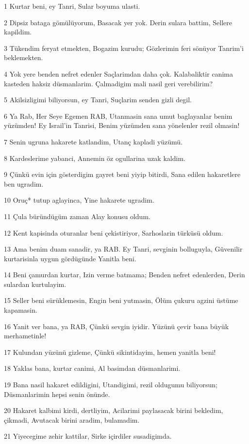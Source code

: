 \par 1 Kurtar beni, ey Tanri, Sular boyuma ulasti.
\par 2 Dipsiz bataga gömülüyorum, Basacak yer yok. Derin sulara battim, Sellere kapildim.
\par 3 Tükendim feryat etmekten, Bogazim kurudu; Gözlerimin feri sönüyor Tanrim'i beklemekten.
\par 4 Yok yere benden nefret edenler Saçlarimdan daha çok. Kalabaliktir canima kasteden haksiz düsmanlarim. Çalmadigim mali nasil geri verebilirim?
\par 5 Akilsizligimi biliyorsun, ey Tanri, Suçlarim senden gizli degil.
\par 6 Ya Rab, Her Seye Egemen RAB, Utanmasin sana umut baglayanlar benim yüzümden! Ey Israil'in Tanrisi, Benim yüzümden sana yönelenler rezil olmasin!
\par 7 Senin ugruna hakarete katlandim, Utanç kapladi yüzümü.
\par 8 Kardeslerime yabanci, Annemin öz ogullarina uzak kaldim.
\par 9 Çünkü evin için gösterdigim gayret beni yiyip bitirdi, Sana edilen hakaretlere ben ugradim.
\par 10 Oruç* tutup aglayinca, Yine hakarete ugradim.
\par 11 Çula büründügüm zaman Alay konusu oldum.
\par 12 Kent kapisinda oturanlar beni çekistiriyor, Sarhoslarin türküsü oldum.
\par 13 Ama benim duam sanadir, ya RAB. Ey Tanri, sevginin bolluguyla, Güvenilir kurtarisinla uygun gördügünde Yanitla beni.
\par 14 Beni çamurdan kurtar, Izin verme batmama; Benden nefret edenlerden, Derin sulardan kurtulayim.
\par 15 Seller beni sürüklemesin, Engin beni yutmasin, Ölüm çukuru agzini üstüme kapamasin.
\par 16 Yanit ver bana, ya RAB, Çünkü sevgin iyidir. Yüzünü çevir bana büyük merhametinle!
\par 17 Kulundan yüzünü gizleme, Çünkü sikintidayim, hemen yanitla beni!
\par 18 Yaklas bana, kurtar canimi, Al basimdan düsmanlarimi.
\par 19 Bana nasil hakaret edildigini, Utandigimi, rezil oldugumu biliyorsun; Düsmanlarimin hepsi senin önünde.
\par 20 Hakaret kalbimi kirdi, dertliyim, Acilarimi paylasacak birini bekledim, çikmadi, Avutacak birini aradim, bulamadim.
\par 21 Yiyecegime zehir kattilar, Sirke içirdiler susadigimda.
